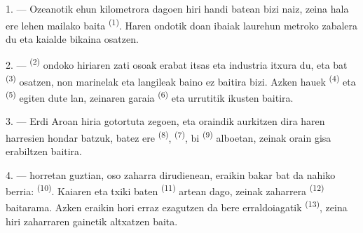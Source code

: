 %
%

\VUsaut{2.0mm}
\VUsaut{3.0mm}
\VUfilet{16mm}
\VUsaut{5.6mm}
\VUsaut{1.4mm}
\VUsaut{2.2mm}

\VUsaut{3.0mm}

1. --- Ozeanotik ehun kilometrora dagoen hiri handi batean bizi naiz, zeina hala
ere lehen mailako  baita \textsuperscript{(1)}. Haren ondotik doan
ibaiak laurehun metroko zabalera du eta kaialde bikaina osatzen.

2. ---  \textsuperscript{(2)} ondoko hiriaren zati osoak erabat
itsas eta industria itxura du, eta  bat \textsuperscript{(3)}
osatzen, non marinelak eta langileak baino ez baitira bizi. Azken hauek
 \textsuperscript{(4)} eta 
\textsuperscript{(5)} egiten dute lan, zeinaren  garaia
\textsuperscript{(6)} eta  urrutitik ikusten baitira.

3. --- Erdi Aroan hiria gotortuta zegoen, eta oraindik aurkitzen dira haren
harresien hondar batzuk, batez ere  \textsuperscript{(8)},
 \textsuperscript{(7)}, bi
 \textsuperscript{(9)} alboetan, zeinak orain
 gisa erabiltzen baitira.

4. ---  horretan guztian, oso zaharra dirudienean, eraikin bakar bat
da nahiko berria:  \textsuperscript{(10)}. Kaiaren eta
 txiki baten \textsuperscript{(11)} artean dago, zeinak
 zaharrera \textsuperscript{(12)} baitarama. Azken eraikin hori
erraz ezagutzen da bere  erraldoiagatik
\textsuperscript{(13)}, zeina hiri zaharraren gainetik altxatzen baita.

